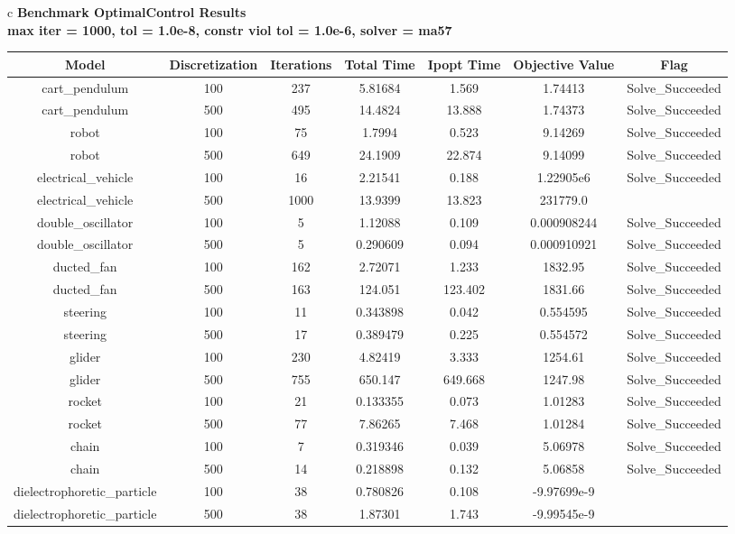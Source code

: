 \documentclass{standalone}
\begin{document}
\begin{tabular}{c}
\hline
\Large\textbf{Benchmark OptimalControl Results}\\
\large\textbf{max iter = 1000, tol = 1.0e-8, constr viol tol = 1.0e-6, solver = ma57}\\
\begin{tabular}{ccccccc}
  \hline
  \textbf{Model} & \textbf{Discretization} & \textbf{Iterations} & \textbf{Total Time} & \textbf{Ipopt Time} & \textbf{Objective Value} & \textbf{Flag} \\\hline
  cart\_pendulum & 100 & 237 & 5.81684 & 1.569 & 1.74413 & Solve\_Succeeded \\
  cart\_pendulum & 500 & 495 & 14.4824 & 13.888 & 1.74373 & Solve\_Succeeded \\
  robot & 100 & 75 & 1.7994 & 0.523 & 9.14269 & Solve\_Succeeded \\
  robot & 500 & 649 & 24.1909 & 22.874 & 9.14099 & Solve\_Succeeded \\
  electrical\_vehicle & 100 & 16 & 2.21541 & 0.188 & 1.22905e6 & Solve\_Succeeded \\
  electrical\_vehicle & 500 & 1000 & 13.9399 & 13.823 & 231779.0 & \color{red}{Maximum\_Iterations\_Exceeded} \\
  double\_oscillator & 100 & 5 & 1.12088 & 0.109 & 0.000908244 & Solve\_Succeeded \\
  double\_oscillator & 500 & 5 & 0.290609 & 0.094 & 0.000910921 & Solve\_Succeeded \\
  ducted\_fan & 100 & 162 & 2.72071 & 1.233 & 1832.95 & Solve\_Succeeded \\
  ducted\_fan & 500 & 163 & 124.051 & 123.402 & 1831.66 & Solve\_Succeeded \\
  steering & 100 & 11 & 0.343898 & 0.042 & 0.554595 & Solve\_Succeeded \\
  steering & 500 & 17 & 0.389479 & 0.225 & 0.554572 & Solve\_Succeeded \\
  glider & 100 & 230 & 4.82419 & 3.333 & 1254.61 & Solve\_Succeeded \\
  glider & 500 & 755 & 650.147 & 649.668 & 1247.98 & Solve\_Succeeded \\
  rocket & 100 & 21 & 0.133355 & 0.073 & 1.01283 & Solve\_Succeeded \\
  rocket & 500 & 77 & 7.86265 & 7.468 & 1.01284 & Solve\_Succeeded \\
  chain & 100 & 7 & 0.319346 & 0.039 & 5.06978 & Solve\_Succeeded \\
  chain & 500 & 14 & 0.218898 & 0.132 & 5.06858 & Solve\_Succeeded \\
  dielectrophoretic\_particle & 100 & 38 & 0.780826 & 0.108 & -9.97699e-9 & \color{red}{Infeasible\_Problem\_Detected} \\
  dielectrophoretic\_particle & 500 & 38 & 1.87301 & 1.743 & -9.99545e-9 & \color{red}{Infeasible\_Problem\_Detected} \\\hline
\end{tabular}
\end{tabular}
\end{document}
